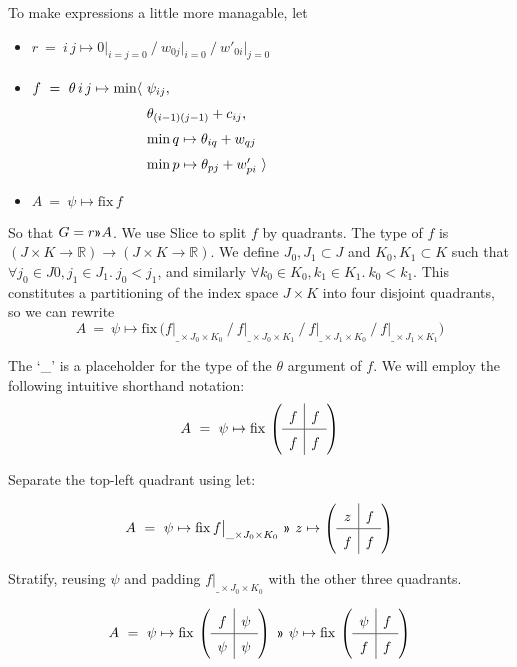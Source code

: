 \documentclass{article}
\newcommand\R{\mathbb{R}}
\begin{document}
To make expressions a little more managable, let
\begin{itemize}
  \item $r ~=~ i\,j\mapsto 0\big|_{i=j=0} ~\big/~ w_{0j}\big|_{i=0} ~\big/~ w'_{0i}\big|_{j=0}$
  \item $\begin{array}[t]{@{}l@{~}l}
    f ~=~ \theta\,i\,j \mapsto \min\langle & \psi_{ij}, \\
                & \theta_{(i-1)(j-1)} + c_{ij}, \\
                & \min q\mapsto \theta_{iq} + w_{qj} \\
                & \min p\mapsto \theta_{pj} + w'_{pi}~\rangle
  \end{array}$
  \item $A ~=~ \psi\mapsto \mathrm{fix}\,f$
\end{itemize}

So that $G = r\applt A$. We use Slice to split $f$ by quadrants.
The type of $f$ is $(J\times K\to\R)\to(J\times K\to\R)$. We define $J_0,J_1\subset J$
and $K_0,K_1\subset K$ such that $\forall j_0\in J0,j_1\in J_1.~j_0<j_1$, and
similarly $\forall k_0\in K_0,k_1\in K_1.~k_0<k_1$. This constitutes a partitioning
of the index space $J\times K$ into four disjoint quadrants, so we can rewrite
%
\[A ~=~ \psi\mapsto
        \mathrm{fix}\,\Big( f\big|_{\_\times J_0\times K_0} ~\big/~ 
							f\big|_{\_\times J_0\times K_1} ~\big/~
							f\big|_{\_\times J_1\times K_0} ~\big/~
							f\big|_{\_\times J_1\times K_1}
  \Big)\]
  
The `\_' is a placeholder for the type of the $\theta$ argument of $f$.
We will employ the following intuitive shorthand notation:
\newcommand\quadrants[4]{
  \renewcommand\arraystretch{1.5}
   \begin{array}{c|c}
     #1 & #2 \\ \hline
     #3 & #4
   \end{array}}
%
\[
A ~=~ \psi\mapsto\mathrm{fix}\,\left(\quadrants{f}{f}{f}{f}\right)
 \]

Separate the top-left quadrant using let:

\[
A ~=~ \psi\mapsto\mathrm{fix}\, f\big|_{\_\times J_0\times K_0} ~\applt~ z\mapsto\left(\quadrants{z}{f}{f}{f}\right)
 \]

Stratify, reusing $\psi$ and padding $f\big|_{\_\times J_0\times K_0}$ with the other three quadrants.

\[
A ~=~  \psi\mapsto\mathrm{fix}\,\left( \quadrants{f}{\psi}{\psi}{\psi} \right)
  ~\applt~ 
  \psi\mapsto\mathrm{fix}\,\left( \quadrants{\psi}{f}{f}{f} \right)
\]
\end{document}
